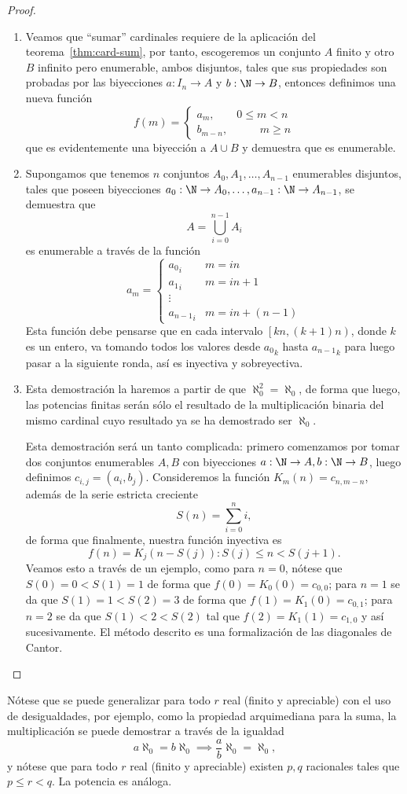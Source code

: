 \documentclass[11pt,oneside,a4paper]{book}
\begin{document}
\begin{proof}
\begin{enumerate}[$a$)]
\item Veamos que ``sumar'' cardinales requiere de la aplicación del teorema~\ref{thm:card-sum}, por tanto, escogeremos un conjunto $A$ finito y otro $B$ infinito pero enumerable, ambos disjuntos, tales que sus propiedades son probadas por las biyecciones $a:I_n\rightarrow A$ y $b:\N\rightarrow B$, entonces definimos una nueva función
$$f(m)=\begin{cases}
a_m, &0\leq m\lt n\\
b_{m-n}, &\phantom{0\lt}\;m\geq n
\end{cases}$$
que es evidentemente una biyección a $A\cup B$ y demuestra que es enumerable.
\item Supongamos que tenemos $n$ conjuntos $A_0,A_1,\dots,A_{n-1}$ enumerables disjuntos, tales que poseen biyecciones $a_0:\N\rightarrow A_0,\dots,a_{n-1}:\N\rightarrow A_{n-1}$, se demuestra que
$$A=\bigcup_{i=0}^{n-1} A_i$$
es enumerable a través de la función
$$a_m=\begin{cases}
{a_0}_i &m=in\\
{a_1}_i &m=in+1\\
\vdots\\
{a_{n-1}}_i &m=in+(n-1)
\end{cases}$$
Esta función debe pensarse que en cada intervalo $\left[kn,(k+1)n\right)$, donde $k$ es un entero, va tomando todos los valores desde ${a_0}_k$ hasta ${a_{n-1}}_k$ para luego pasar a la siguiente ronda, así es inyectiva y sobreyectiva.
\item Esta demostración la haremos a partir de que $\aleph_0^2=\aleph_0$, de forma que luego, las potencias finitas serán sólo el resultado de la multiplicación binaria del mismo cardinal cuyo resultado ya se ha demostrado ser $\aleph_0$.

Esta demostración será un tanto complicada: primero comenzamos por tomar dos conjuntos enumerables $A,B$ con biyecciones $a:\N\rightarrow A,b:\N\rightarrow B$, luego definimos $c_{i,j}=(a_i,b_j)$. Consideremos la función $K_m(n)=c_{n,m-n}$, además de la serie estricta creciente
$$S(n)=\sum_{i=0}^n i,$$
de forma que finalmente, nuestra función inyectiva es
$$f(n)=K_j(n-S(j)):S(j)\leq n\lt S(j+1).$$
Veamos esto a través de un ejemplo, como para $n=0$, nótese que $S(0)=0\lt S(1)=1$ de forma que $f(0)=K_0(0)=c_{0,0}$; para $n=1$ se da que $S(1)=1\lt S(2)=3$ de forma que $f(1)=K_1(0)=c_{0,1}$; para $n=2$ se da que $S(1)\lt 2\lt S(2)$ tal que $f(2)=K_1(1)=c_{1,0}$ y así sucesivamente. El método descrito es una formalización de las diagonales de Cantor.
\end{enumerate}
\end{proof}
Nótese que se puede generalizar para todo $r$ real (finito y apreciable) con el uso de desigualdades, por ejemplo, como la propiedad arquimediana para la suma, la multiplicación se puede demostrar a través de la igualdad
$$a\aleph_0=b\aleph_0\implies \frac{a}{b}\aleph_0=\aleph_0,$$
y nótese que para todo $r$ real (finito y apreciable) existen $p,q$ racionales tales que $p\leq r\lt q$. La potencia es análoga.
\end{document}
